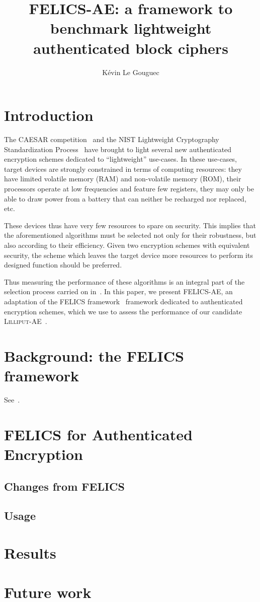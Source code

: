 \documentclass{article}
\title{
  FELICS-AE: a framework to benchmark lightweight authenticated block ciphers
}
\author[*]{Kévin Le Gouguec}
\affil[*]{
  Airbus CyberSecurity -
  ZA Clef Saint-Pierre,
  1 Bd Jean Moulin,
  CS 40001,
  MetaPole,
  78996 ÉLANCOURT Cedex -
  France -
  \href{mailto:kevin.legouguec@airbus.com}{kevin.legouguec@airbus.com}
}
\begin{document}
\maketitle

\section{Introduction}
\label{sec:intro}

The CAESAR competition~\cite{CAESAR:submissions} and the NIST
Lightweight Cryptography Standardization Process~\cite{NIST:LWC} have
brought to light several new authenticated encryption schemes
dedicated to ``lightweight'' use-cases.  In these use-cases, target
devices are strongly constrained in terms of computing resources: they
have limited volatile memory (RAM) and non-volatile memory (ROM),
their processors operate at low frequencies and feature few registers,
they may only be able to draw power from a battery that can neither be
recharged nor replaced, etc.

These devices thus have very few resources to spare on security.  This
implies that the aforementioned algorithms must be selected not only
for their robustness, but also according to their efficiency.  Given
two encryption schemes with equivalent security, the scheme which
leaves the target device more resources to perform its designed
function should be preferred.

Thus measuring the performance of these algorithms is an integral part
of the selection process carried on in~\cite{NIST:LWC}.  In this
paper, we present FELICS-AE, an adaptation of the FELICS
framework~\cite{FELICS:paper} framework dedicated to authenticated
encryption schemes, which we use to assess the performance of our
candidate \textsc{Lilliput-AE}~\cite{NIST:Lilliput-AE}.

\section{Background: the FELICS framework}
\label{sec:background}

See~\cite{FELICS:paper}.

\section{FELICS for Authenticated Encryption}
\label{sec:felics-ae}

\subsection{Changes from FELICS}
\label{sec:felics-ae/diff-felics}

\subsection{Usage}
\label{sec:felics-ae/usage}

\section{Results}
\label{sec:results}

\section{Future work}
\label{sec:future}



\end{document}
